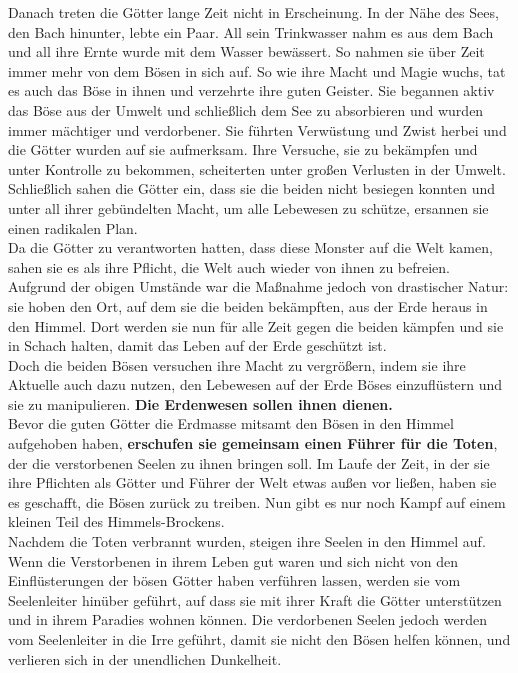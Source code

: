 Danach treten die Götter lange Zeit nicht in Erscheinung. In der Nähe des Sees, den Bach hinunter, lebte ein Paar. All sein Trinkwasser nahm es aus dem Bach und all ihre Ernte wurde mit dem Wasser bewässert. So nahmen sie über Zeit immer mehr von dem Bösen in sich auf. So wie ihre Macht und Magie wuchs, tat es auch das Böse in ihnen und verzehrte ihre guten Geister. Sie begannen aktiv das Böse aus der Umwelt und schließlich dem See zu absorbieren und wurden immer mächtiger und verdorbener. Sie führten Verwüstung und Zwist herbei und die Götter wurden auf sie aufmerksam. Ihre Versuche, sie zu bekämpfen und unter Kontrolle zu bekommen, scheiterten unter großen Verlusten in der Umwelt. Schließlich sahen die Götter ein, dass sie die beiden nicht besiegen konnten und unter all ihrer gebündelten Macht, um alle Lebewesen zu schütze, ersannen sie einen radikalen Plan.\\
Da die Götter zu verantworten hatten, dass diese Monster auf die Welt kamen, sahen sie es als ihre Pflicht, die Welt auch wieder von ihnen zu befreien. Aufgrund der obigen Umstände war die Maßnahme jedoch von drastischer Natur: sie hoben den Ort, auf dem sie die beiden bekämpften, aus der Erde heraus in den Himmel. Dort werden sie nun für alle Zeit gegen die beiden kämpfen und sie in Schach halten, damit das Leben auf der Erde geschützt ist.\\
Doch die beiden Bösen versuchen ihre Macht zu vergrößern, indem sie ihre Aktuelle auch dazu nutzen, den Lebewesen auf der Erde Böses einzuflüstern und sie zu manipulieren. \textbf{Die Erdenwesen sollen ihnen dienen.}\\
Bevor die guten Götter die Erdmasse mitsamt den Bösen in den Himmel aufgehoben haben, \textbf{erschufen sie gemeinsam einen Führer für die Toten}, der die verstorbenen Seelen zu ihnen bringen soll. Im Laufe der Zeit, in der sie ihre Pflichten als Götter und Führer der Welt etwas außen vor ließen, haben sie es geschafft, die Bösen zurück zu treiben. Nun gibt es nur noch Kampf auf einem kleinen Teil des Himmels-Brockens.\\
Nachdem die Toten verbrannt wurden, steigen ihre Seelen in den Himmel auf. Wenn die Verstorbenen in ihrem Leben gut waren und sich nicht von den Einflüsterungen der bösen Götter haben verführen lassen, werden sie vom Seelenleiter hinüber geführt, auf dass sie mit ihrer Kraft die Götter unterstützen und in ihrem Paradies wohnen können. Die verdorbenen Seelen jedoch werden vom Seelenleiter in die Irre geführt, damit sie nicht den Bösen helfen können, und verlieren sich in der unendlichen Dunkelheit.

